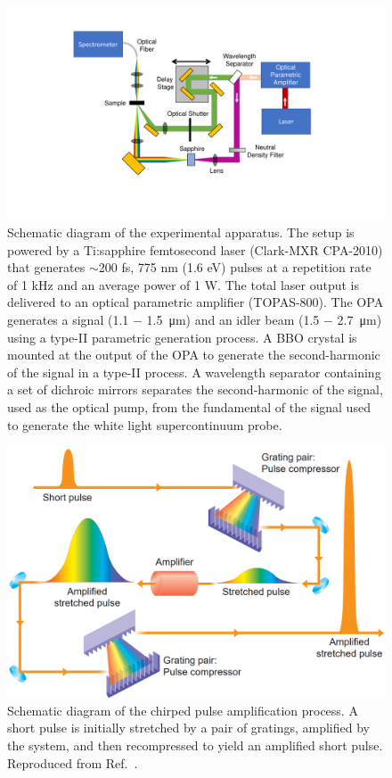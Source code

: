 \begin{figure}[H]
	\centering
	\includegraphics[trim={6cm 4cm 6cm 2cm}, clip, scale=0.7]{images/chapter_methods/setup_schematic}
	\caption{ Schematic diagram of the experimental apparatus. The setup is powered by a Ti:sapphire femtosecond laser (Clark-MXR CPA-2010) that generates $\sim$200 fs, 775 nm (1.6 eV) pulses at a repetition rate of 1 kHz and an average power of 1 W. The total laser output is delivered to an optical parametric amplifier (TOPAS-800). The OPA generates a signal (1.1 $-$ \SI{1.5}{\micro\meter}) and an idler beam (1.5 $-$ \SI{2.7}{\micro\meter}) using a type-II parametric generation process.  A BBO crystal is mounted at the output of the OPA to generate the second-harmonic of the signal in a type-II process. A wavelength separator containing a set of dichroic mirrors separates the second-harmonic of the signal, used as the optical pump, from the fundamental of the signal used to generate the white light supercontinuum probe. }
	\label{fig:setup_schematic}
\end{figure}

\begin{figure}[ht]
	\centering
	\includegraphics[scale=0.31]{images/chapter_methods/cpa_process_service}
	\caption{Schematic diagram of the chirped pulse amplification process. A short pulse is initially stretched by a pair of gratings, amplified by the system, and then recompressed to yield an amplified short pulse. Reproduced from Ref.\ \cite{service154}.}
	\label{fig:cpa_process}
\end{figure}



